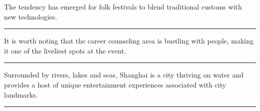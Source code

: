 \documentclass[11pt,a4paper]{article}
\newcommand{\num}[1]{\makebox[1.9em][r]{#1.}\hspace{0.3em}}
\newcommand{\wline}{\noindent\rule{\linewidth}{0.4pt}}
\begin{document}
\begin{minipage}{\linewidth}

\num{34}The tendency has emerged for folk festivals to blend traditional customs with new technologies.

\vspace{0.25em}

\wline

\end{minipage}

\begin{minipage}{\linewidth}

\num{35}It is worth noting that the career counseling area is bustling with people, making it one of the liveliest spots at the event.

\vspace{0.25em}

\wline

\end{minipage}

\begin{minipage}{\linewidth}

\num{36}Surrounded by rivers, lakes and seas, Shanghai is a city thriving on water and provides a host of unique entertainment experiences associated with city landmarks.

\vspace{0.25em}

\wline

\end{minipage}
\end{document}
